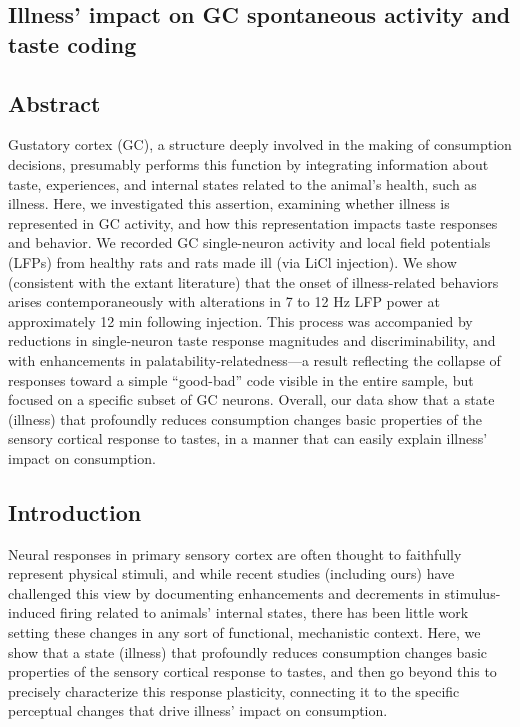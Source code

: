 \begin{refsection}

\chapter[Illness and Taste Processing]{Illness’ impact on GC spontaneous activity and taste coding}

\section{Abstract}
Gustatory cortex (GC), a structure deeply involved in the making of consumption decisions, presumably performs this function by integrating information about taste, experiences, and internal states related to the animal’s health, such as illness. Here, we investigated this assertion, examining whether illness is represented in GC activity, and how this representation impacts taste responses and behavior. We recorded GC single-neuron activity and local field potentials (LFPs) from healthy rats and rats made ill (via LiCl injection). We show (consistent with the extant literature) that the onset of illness-related behaviors arises contemporaneously with alterations in 7 to 12 Hz LFP power at approximately 12 min following injection. This process was accompanied by reductions in single-neuron taste response magnitudes and discriminability, and with enhancements in palatability-relatedness—a result reflecting the collapse of responses toward a simple “good-bad” code visible in the entire sample, but focused on a specific subset of GC neurons. Overall, our data show that a state (illness) that profoundly reduces consumption changes basic properties of the sensory cortical response to tastes, in a manner that can easily explain illness’ impact on consumption.

\section{Introduction}
Neural responses in primary sensory cortex are often thought to faithfully represent physical stimuli, and while recent studies (including ours) have challenged this view by documenting enhancements and decrements in stimulus-induced firing related to animals’ internal states, there has been little work setting these changes in any sort of functional, mechanistic context. Here, we show that a state (illness) that profoundly reduces consumption changes basic properties of the sensory cortical response to tastes, and then go beyond this to precisely characterize this response plasticity, connecting it to the specific perceptual changes that drive illness’ impact on consumption.


\end{refsection}

